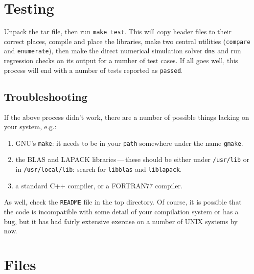 \documentclass[11pt,a4paper]{report}
\begin{document}
\section{Testing}

Unpack the tar file, then run \texttt{make test}. This will copy
header files to their correct places, compile and place the libraries,
make two central utilities (\texttt{compare} and \texttt{enumerate}),
then make the direct numerical simulation solver \texttt{dns} and run
regression checks on its output for a number of test cases. If all
goes well, this process will end with a number of tests reported as
\texttt{passed}. 

\subsection{Troubleshooting}
If the above process didn't work, there are a number of possible
things lacking on your system, e.g.:
\begin{enumerate}
\item
GNU's \texttt{make}: it needs to be in your
\texttt{path} somewhere under the name \texttt{gmake}.
\item
the BLAS and LAPACK libraries\,---\,these should be
either under \texttt{/usr/lib} or in \texttt{/usr/local/lib}: search
for \texttt{libblas} and \texttt{liblapack}.
\item
a standard C++ compiler, or a FORTRAN77 compiler.
\end{enumerate}
As well, check the \texttt{README} file in the top directory. Of
course, it is possible that the code is incompatible with some detail
of your compilation system or has a bug, but it has had fairly
extensive exercise on a number of UNIX systems by now.


\section{Files}
\end{document}
